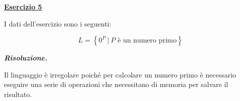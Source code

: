 \documentclass[a4paper]{article}
\begin{document}
	\newpage
	
	\noindent
	\textcolor{Red3}{\textbf{\underline{Esercizio 5}}}\newline
	
	\noindent
	I dati dell'esercizio sono i seguenti:
	
	\begin{equation*}
		L = \left\{0^{P} \: \left| \: P \text{ è un numero primo} \right.\right\}
	\end{equation*}\newline
	
	\noindent
	\textcolor{Green4}{\textbf{\emph{Risoluzione.}}}\newline
	
	\noindent
	Il linguaggio è irregolare poiché per calcolare un numero primo è necessario eseguire una serie di operazioni che necessitano di memoria per salvare il risultato.
	
\end{document}
